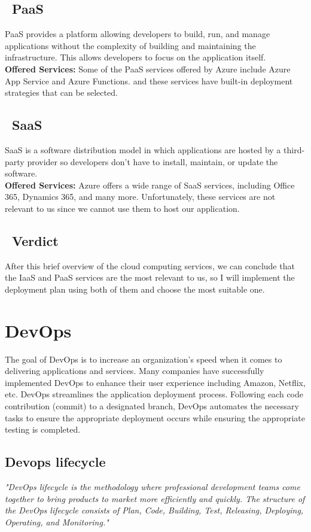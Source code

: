 \subsection*{ \textbullet\ PaaS}
\noindent
PaaS provides a platform allowing developers to build, run, and manage applications without the complexity of building and maintaining the infrastructure. This allows developers to focus on the application itself.
\noindent \\
\textbf{Offered Services:} Some of the PaaS services offered by Azure include Azure App Service and Azure Functions. and these services have built-in deployment strategies that can be selected.
\subsection*{ \textbullet\ SaaS}
\noindent
SaaS is a software distribution model in which applications are hosted by a third-party provider so developers don't have to install, maintain, or update the software.
\noindent \\
\textbf{Offered Services:} Azure offers a wide range of SaaS services, including Office 365, Dynamics 365, and many more. Unfortunately, these services are not relevant to us since we cannot use them to host our application.
\subsection*{ \textbullet\ Verdict}
After this brief overview of the cloud computing services, we can conclude that the IaaS and PaaS services are the most relevant to us, so I will implement the deployment plan using both of them and choose the most suitable one.

\section{DevOps}
The goal of DevOps is to increase an organization's speed when it comes to delivering applications and services. Many companies have successfully implemented DevOps to enhance their user experience including Amazon, Netflix, etc.
DevOps streamlines the application deployment process. Following each code contribution (commit) to a designated branch, DevOps automates the necessary tasks to ensure the appropriate deployment occurs while ensuring the appropriate testing is completed.
\subsection{Devops lifecycle}
\emph{"DevOps lifecycle is the methodology where professional development teams come together to bring products to market more efficiently and quickly. The structure of the DevOps lifecycle consists of Plan, Code, Building, Test, Releasing, Deploying, Operating,  and Monitoring."} \cite{webArticle0}

